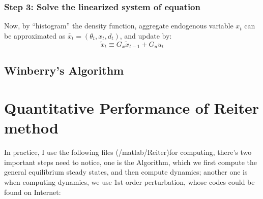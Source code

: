\subsubsection*{Step 3: Solve the linearized system of equation }
Now, by ``histogram'' the density function, aggregate endogenous variable $x_t$ can be approximated  as $\tilde{x_t} = (\theta_t, x_t, d_t)$, and update by:
\[ \tilde{x}_t \equiv G_x \tilde{x}_{t-1} + G_u u_t\]



\subsection{Winberry's Algorithm}

\newpage


\section{Quantitative Performance of Reiter method}

In practice, I use the following files (/matlab/Reiter)for computing, there's two important steps need to notice, one is the Algorithm, which we first compute the general equilibrium steady states, and then compute dynamics; another one is when computing dynamics, we use 1st order perturbation, whose codes could be found on Internet: 

